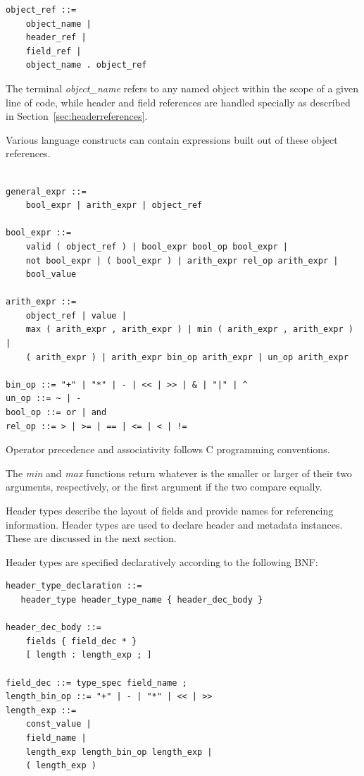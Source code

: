 \documentclass[12pt]{article}
\begin{document}
\begin{lstlisting}[style=BNFstyle]
object_ref ::=
    object_name |
    header_ref |
    field_ref |
    object_name . object_ref
\end{lstlisting}

The terminal \textit{object_name} refers to any named object within the scope
of a given line of code, while header and field references are handled
specially as described in Section~\ref{sec:headerreferences}.


Various language constructs can contain expressions built out of these object
references.

\begin{lstlisting}[style=BNFstyle]

general_expr ::= 
    bool_expr | arith_expr | object_ref

bool_expr ::=
    valid ( object_ref ) | bool_expr bool_op bool_expr |
    not bool_expr | ( bool_expr ) | arith_expr rel_op arith_expr |
    bool_value

arith_expr ::=
    object_ref | value | 
    max ( arith_expr , arith_expr ) | min ( arith_expr , arith_expr ) |
    ( arith_expr ) | arith_expr bin_op arith_expr | un_op arith_expr

bin_op ::= "+" | "*" | - | << | >> | & | "|" | ^
un_op ::= ~ | -
bool_op ::= or | and
rel_op ::= > | >= | == | <= | < | !=

\end{lstlisting}

Operator precedence and associativity follows C programming conventions.

The \textit{min} and \textit{max} functions return whatever is the smaller or
larger of their two arguments, respectively, or the first argument if the two 
compare equally.



Header types describe the layout of fields and provide names for referencing 
information. Header types are used to declare header and metadata instances. 
These are discussed in the next section.

Header types are specified declaratively according to the following BNF:

\begin{lstlisting}[style=BNFstyle]
header_type_declaration ::= 
   header_type header_type_name { header_dec_body }

header_dec_body ::=
    fields { field_dec * }
    [ length : length_exp ; ]

field_dec ::= type_spec field_name ;
length_bin_op ::= "+" | - | "*" | << | >>
length_exp ::=
    const_value |
    field_name |
    length_exp length_bin_op length_exp |
    ( length_exp )

\end{lstlisting}
\end{document}
